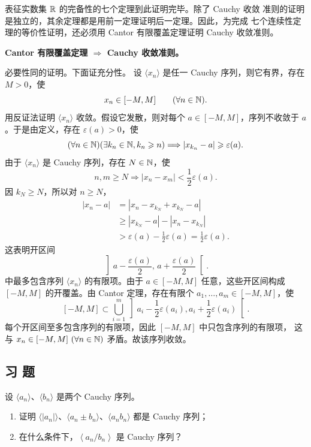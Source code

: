 表征实数集 \(\mathbb{R}\) 的完备性的七个定理到此证明完毕。除了 Cauchy 收敛
准则的证明是独立的，其余定理都是用前一定理证明后一定理。因此，为完成
七个连续性定理的等价性证明，还必须用 Cantor 有限覆盖定理证明 Cauchy
收敛准则。

\textbf{Cantor 有限覆盖定理 \(\Longrightarrow\) Cauchy 收敛准则。}

必要性同的证明。下面证充分性。
设 \(\langle x_n\rangle\) 是任一 Cauchy 序列，则它有界，存在 \(M>0\)，使
\[
x_n\in[-M,M]\qquad(\forall n\in\mathbb{N}).
\]
用反证法证明 \(\langle x_n\rangle\) 收敛。假设它发散，则对每个
\(a\in[-M,M]\)，序列不收敛于 \(a\)。于是由定义，存在
\(\varepsilon(a)>0\)，使
\[
(\forall n\in\mathbb{N})(\exists k_n\in\mathbb{N}, k_n\geqslant n)
\Longrightarrow |x_{k_n}-a|\geqslant\varepsilon(a).
\]
由于 \(\langle x_n\rangle\) 是 Cauchy 序列，存在 \(N\in\mathbb{N}\)，使
\[
n,m\geqslant N\Longrightarrow
|x_n-x_m|<\frac12\varepsilon(a).
\]
因 \(k_N\geqslant N\)，所以对 \(n\geqslant N\)，
\[
\begin{aligned}
|x_n-a|&=|x_n-x_{k_N}+x_{k_N}-a|\\
&\geqslant|x_{k_N}-a|-|x_n-x_{k_N}|\\
&>\varepsilon(a)-\frac12\varepsilon(a)=\frac12\varepsilon(a).
\end{aligned}
\]
这表明开区间
\[
\left]a-\frac{\varepsilon(a)}2,\,
a+\frac{\varepsilon(a)}2\right[.
\]
中最多包含序列 \(\langle x_n\rangle\) 的有限项。由于 \(a\in[-M,M]\)
任意，这些开区间构成 \([-M,M]\) 的开覆盖。由 Cantor 定理，存在有限个
\(a_1,\ldots,a_m\in[-M,M]\)，使
\[
[-M,M]\subset\bigcup_{i=1}^m
\left]a_i-\frac12\varepsilon(a_i),a_i+\frac12\varepsilon(a_i)\right[.
\]
每个开区间至多包含序列的有限项，因此 \([-M,M]\) 中只包含序列的有限项，
这与 \(x_n\in[-M,M]\ (\forall n\in\N)\) 矛盾。故该序列收敛。
\subsection*{习 题}

\begin{exercise}
\item 设 \(\langle a_n\rangle\)、\(\langle b_n\rangle\) 是两个 Cauchy 序列。
\begin{enumerate}[label=\arabic*)]
  \item 证明 \(\langle|a_n|\rangle\)、\(\langle a_n\pm b_n\rangle\)、\(\langle a_nb_n\rangle\) 都是 Cauchy 序列；
  \item 在什么条件下，\(\left\langle a_n/b_n\right\rangle\) 是 Cauchy 序列？
\end{enumerate}
\end{exercise}

